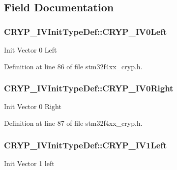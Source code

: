 \subsection{Field Documentation}
\hypertarget{struct_c_r_y_p___i_v_init_type_def_a36a3734747b9c32e2cde67cb54be02f8}{
\subsubsection[{C\-R\-Y\-P\-\_\-\-I\-V0\-Left}]{ C\-R\-Y\-P\-\_\-\-I\-V\-Init\-Type\-Def\-::\-C\-R\-Y\-P\-\_\-\-I\-V0\-Left}}\label{struct_c_r_y_p___i_v_init_type_def_a36a3734747b9c32e2cde67cb54be02f8}
Init Vector 0 Left 

Definition at line 86 of file stm32f4xx\-\_\-cryp.\-h.

\hypertarget{struct_c_r_y_p___i_v_init_type_def_ad7128fb8cf3843c2e0f89cf048cd28d5}{
\subsubsection[{C\-R\-Y\-P\-\_\-\-I\-V0\-Right}]{ C\-R\-Y\-P\-\_\-\-I\-V\-Init\-Type\-Def\-::\-C\-R\-Y\-P\-\_\-\-I\-V0\-Right}}\label{struct_c_r_y_p___i_v_init_type_def_ad7128fb8cf3843c2e0f89cf048cd28d5}
Init Vector 0 Right 

Definition at line 87 of file stm32f4xx\-\_\-cryp.\-h.

\hypertarget{struct_c_r_y_p___i_v_init_type_def_a5edca0a5d021ee77fcfcdf9e29e27a53}{
\subsubsection[{C\-R\-Y\-P\-\_\-\-I\-V1\-Left}]{ C\-R\-Y\-P\-\_\-\-I\-V\-Init\-Type\-Def\-::\-C\-R\-Y\-P\-\_\-\-I\-V1\-Left}}\label{struct_c_r_y_p___i_v_init_type_def_a5edca0a5d021ee77fcfcdf9e29e27a53}
Init Vector 1 left 

